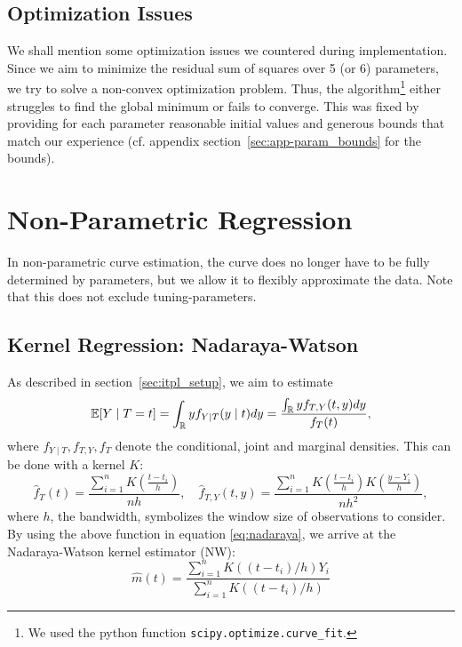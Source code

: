 	\subsection{Optimization Issues}\label{sec:itpl_param_optimizationissues}
		We shall mention some optimization issues we countered during implementation. Since we aim to minimize the residual sum of squares over 5 (or 6) parameters, we try to solve a non-convex optimization problem. Thus, the algorithm\footnote{We used the python function \texttt{scipy.optimize.curve\_fit}.} either struggles to find the global minimum or fails to converge. This was fixed by providing for each parameter reasonable initial values and generous bounds that match our experience (cf. appendix section~\ref{sec:app-param_bounds} for the bounds).

\section{Non-Parametric Regression}
	\label{sec:itpl_nonparametric}
	In non-parametric curve estimation, the curve does no longer have to be fully determined by parameters, but we allow it to flexibly approximate the data. Note that this does not exclude tuning-parameters.

	\subsection{Kernel Regression: Nadaraya-Watson}
		\label{sec:Kernel}
		As described in section~\ref{sec:itpl_setup}, we aim to estimate
		\begin{equation}
			\label{eq:nadaraya}
			\mathbb{E}[Y \mid T=t]
			= \int_{\mathbb{R}} y f_{Y \mid T}(y \mid t) d y
			=\frac{\int_{\mathbb{R}} y f_{T, Y}(t, y) d y}{f_{T}(t)},
		\end{equation}
		where $f_{Y \mid T}, f_{T, Y}, f_{T}$ denote the conditional, joint and marginal densities.
		This can be done with a kernel $K$:
		\begin{equation}
			\hat{f}_{T}(t)=\frac{\sum_{i=1}^{n} K\left(\frac{t-t_{i}}{h}\right)}{n h}, \quad \hat{f}_{T, Y}(t, y)=\frac{\sum_{i=1}^{n} K\left(\frac{t-t_{i}}{h}\right) K\left(\frac{y-Y_{i}}{h}\right)}{n h^{2}},
			\label{eq:kernel_with_bandwidt}
		\end{equation}
		where $h$, the bandwidth, symbolizes the window size of observations to consider. By using the above function in equation \eqref{eq:nadaraya}, we arrive at the Nadaraya-Watson kernel estimator (NW):
		$$\hat{m}(t)=\frac{\sum_{i=1}^{n} K\left(\left(t-t_{i}\right) / h\right) Y_{i}}{\sum_{i=1}^{n} K\left(\left(t-t_{i}\right) / h\right)}$$

